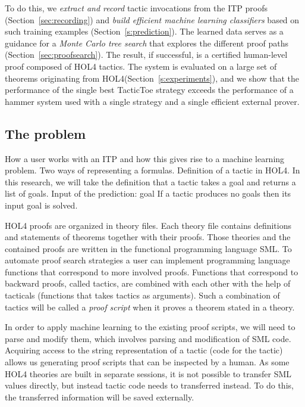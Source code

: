 \documentclass[runningheads,a4paper,draft]{svjour3}
\newcommand{\todoi}[1]{\todo[inline]{#1}}
\def\holfour{\textsf{HOL4}\xspace}
\def\sml{\textsf{SML}\xspace}
\def\tactictoe{\textsf{TacticToe}\xspace}
\begin{document}
\todoi{Rewrite the plan}
  To do this, we \emph{extract and record} tactic invocations from the ITP 
  proofs (Section~\ref{sec:recording}) and
  \emph{build efficient machine learning classifiers} based on such training
  examples (Section~\ref{s:prediction}).  The learned data serves as a 
  guidance for a \emph{Monte Carlo tree search} that explores the different 
  proof paths (Section~\ref{sec:proofsearch}). The result, if
  successful, is a certified human-level proof composed of \holfour
  tactics.  The system is evaluated on a large set of theorems originating
  from \holfour (Section~\ref{s:experiments}), and we show that the performance 
  of the single best \tactictoe strategy exceeds the performance of a hammer 
  system used with a single strategy and a single efficient external prover.


\subsection{The problem}
How a user works with an ITP and how this gives rise to a machine learning 
problem.
Two ways of representing a formulas.
Definition of a tactic in \holfour. In this research, we will take the definition
that a tactic takes a goal and returns a list of goals.
Input of the prediction: goal
If a tactic produces no goals then its input goal is solved.

\holfour proofs are organized in theory files.
Each theory file contains definitions and statements of theorems together with
their proofs. Those theories and the contained proofs
are written
in the functional programming language \sml. To automate
proof search strategies a user can implement programming language functions
that correspond to more involved proofs.
Functions that correspond to backward proofs, called tactics, are combined with 
each other with the help of 
tacticals (functions that takes
tactics as arguments). Such a combination of tactics will be called a 
\emph{proof script} when it
proves a theorem stated in a theory.

In order to apply machine learning to the existing proof scripts, we will need 
to
parse and modify them, which involves parsing and modification of \sml code.
Acquiring access to the string representation of a tactic (code for the tactic) 
allows us generating
proof scripts that can be inspected by a human.
As some \holfour theories are built in separate sessions, it is not possible
to transfer \sml values directly, but instead tactic code needs to transferred 
instead.
To do this, the transferred information will be saved externally.
\end{document}
